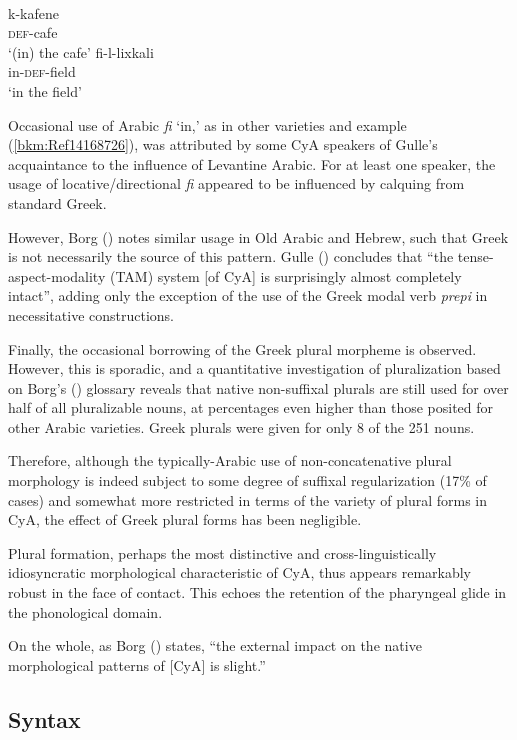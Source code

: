 \documentclass[output=paper]{langsci/langscibook}
\begin{document}
\ea
{}\\
\ea \gll k-kafene\\
     \textsc{def}-cafe  \\
\glt ‘(in) the cafe’
\ex \gll fi-l-lixkali\\
     in-\textsc{def}-field\\
\glt ‘in the field’\label{bkm:Ref14168726} \label{field}
\z
\z

Occasional use of Arabic \textit{fi} ‘in,’ as in other varieties and example (\ref{bkm:Ref14168726}), was attributed by some CyA speakers of Gulle’s acquaintance to the influence of Levantine Arabic. For at least one speaker, the usage of locative/directional \textit{fi} appeared to be influenced by calquing from standard Greek. 

However, Borg (\citeyear[3]{Borg2004}) notes similar usage in Old Arabic and Hebrew, such that Greek is not necessarily the source of this pattern. Gulle (\citeyear[47]{Gulle2016}) concludes that “the tense-aspect-modality (TAM) system [of CyA] is surprisingly almost completely intact”, adding only the exception of the use of the Greek modal verb \textit{prepi} in necessitative constructions. 

Finally, the occasional borrowing of the Greek plural morpheme is observed. However, this is sporadic, and a quantitative investigation of pluralization based on Borg's (\citeyear{Borg2004}) glossary \citep{Walter2017} reveals that native non-suffixal plurals are still used for over half of all pluralizable nouns, at percentages even higher than those posited for other Arabic varieties. Greek plurals were given for only 8 of the 251 nouns. 

Therefore, although the typically-Arabic use of non-concatenative plural morphology is indeed subject to some degree of suffixal regularization (17\% of cases) and somewhat more restricted in terms of the variety of plural forms in CyA, the effect of Greek plural forms has been negligible. 

Plural formation, perhaps the most distinctive and cross-linguistically idiosyncratic morphological characteristic of CyA, thus appears remarkably robust in the face of contact. This echoes the retention of the pharyngeal glide in the phonological domain. 

On the whole, as Borg (\citeyear[57]{Borg1994}) states, “the external impact on the native morphological patterns of [CyA] is slight.” 

\subsection{Syntax}
\end{document}
